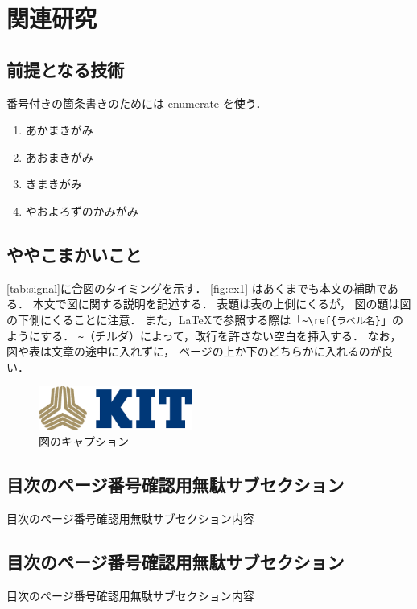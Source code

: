 \section{関連研究}\label{sec:関連研究}

\subsection{前提となる技術}\label{subsec:前提となる技術}

番号付きの箇条書きのためには enumerate を使う．

\begin{enumerate}
\item あかまきがみ
\item あおまきがみ
\item きまきがみ
\item やおよろずのかみがみ
\end{enumerate}


\subsection{ややこまかいこと}
\autoref{tab:signal}に合図のタイミングを示す．
\autoref{fig:ex1} はあくまでも本文の補助である．
本文で図に関する説明を記述する．
表題は表の上側にくるが，
図の題は図の下側にくることに注意．
また，\LaTeX{}で参照する際は「\verb|~\ref{ラベル名}|」のようにする．
\verb|~|（チルダ）によって，改行を許さない空白を挿入する．
なお，図や表は文章の途中に入れずに，
ページの上か下のどちらかに入れるのが良い．


\begin{figure}[bt]\centering
\includegraphics[width=0.45\textwidth]{fig/kit.eps}
\caption{図のキャプション}
\label{fig:ex1}
\end{figure}


\subsection{目次のページ番号確認用無駄サブセクション}
目次のページ番号確認用無駄サブセクション内容


\subsection{目次のページ番号確認用無駄サブセクション}
目次のページ番号確認用無駄サブセクション内容

